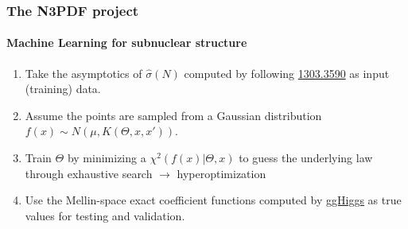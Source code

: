 \documentclass[aspectratio=43]{beamer}
\begin{document}
\begin{frame}

	\frametitle{The N3PDF project}
	\framesubtitle{Machine Learning for subnuclear structure}

	\begin{enumerate}
		\item Take the asymptotics of $\hat{\sigma}(N)$ computed by following \href{https://arxiv.org/abs/1303.3590}{{\color{blue}1303.3590}} as input (training) data.
		\item Assume the points are sampled from a Gaussian distribution $f(x) \sim N(\mu, K(\Theta, x, x'))$.
		\item Train $\Theta$ by minimizing a $\chi^{2}(f(x)|\Theta, x)$ to guess the underlying law through exhaustive search $\longrightarrow$ {\color{blue}hyperoptimization}
		\item Use the Mellin-space exact coefficient functions computed by \href{https://www.ge.infn.it/~bonvini/higgs/}{{\color{blue}ggHiggs}} as true values for testing and validation.
	\end{enumerate}

\end{frame}
\end{document}
